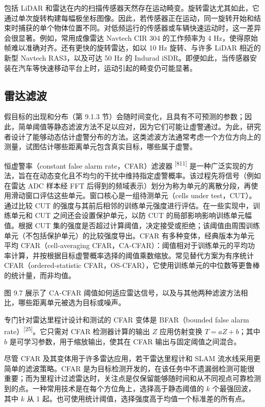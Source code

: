 包括 LiDAR 和雷达在内的扫描传感器天然存在运动畸变。旋转雷达尤其如此，它通过单次旋转构建每幅极坐标图像。因此，若传感器正在运动，同一旋转开始和结束时捕获的单个物体位置不同。对低频运行的传感器或车辆快速运动时，这一差异会很显著。例如，常用成像雷达 Navtech CIR 304 的工作频率为 4 Hz，使得原始帧难以准确对齐。还有更快的旋转雷达，如以 10 Hz 旋转、与许多 LiDAR 相近的新型 Navtech RAS3，以及可达 50 Hz 的 Indurad iSDR。即便如此，当传感器安装在汽车等快速移动平台上时，运动引起的畸变仍可能显著。

\subsection{雷达滤波}

假目标的出现和分布（第 9.1.3 节）会随时间变化，且具有不可预测的参数；因此，简单阈值等静态滤波方法不足以应对，因为它们可能让虚警通过。为此，研究者设计了能够动态估计虚警分布的方法。这类滤波方法通常考虑一个方位方向上的测量，试图估计哪些距离单元包含真实目标，哪些属于虚警。

恒虚警率（constant false alarm rate，CFAR）滤波器 \textsuperscript{[811]} 是一种广泛实现的方法，旨在在动态变化且不均匀的干扰中维持指定虚警概率。该过程先将信号（例如在雷达 ADC 样本经 FFT 后得到的频域表示）划分为称为单元的离散分段，再使用滑动窗口评估这些单元。窗口核心是一组待测单元（cells under test，CUT）。通过比较 CUT 的强度与其前后相邻的训练单元强度进行评估。在一些实现中，训练单元和 CUT 之间还会设置保护单元，以防 CUT 的局部影响影响训练单元幅值。根据 CUT 集的强度是否超过计算阈值，决定接受或拒绝；该阈值由周围训练单元（不包括保护单元）的比较强度导出。CFAR 有多种变体，经典版本为单元平均 CFAR（cell-averaging CFAR，CA-CFAR）：阈值相对于训练单元的平均功率计算，并按根据目标虚警概率选择的阈值乘数缩放。常见替代方案为有序统计 CFAR（ordered-statistic CFAR，OS-CFAR），它使用训练单元的中位数等更鲁棒的统计量，而非均值。

图 9.7 展示了 CA-CFAR 阈值如何适应雷达信号，以及与其他两种滤波方法相比，哪些距离单元被选为目标或噪声。

专门针对雷达里程计设计和测试的 CFAR 变体是 BFAR（bounded false alarm rate）\textsuperscript{[25]}。它只需对 CFAR 检测器计算的输出 $Z$ 应用仿射变换 $T = aZ + b$；其中 $b$ 是可学习参数，用于缩放输出，使其在 CFAR 输出与固定阈值之间混合。

尽管 CFAR 及其变体用于许多雷达应用，若干雷达里程计和 SLAM 流水线采用更简单的滤波策略。CFAR 是为目标检测开发的，在该任务中不遗漏弱检测可能很重要；而为里程计过滤雷达时，关注点是仅保留能够随时间和从不同视点可靠检测到的点。一种常用技术是在每个方位角上，选择高于静态阈值的 $k$ 个最强回波，其中 $k$ 从 1 起。也可使用统计阈值，选择强度高于均值一个标准差的所有点。


